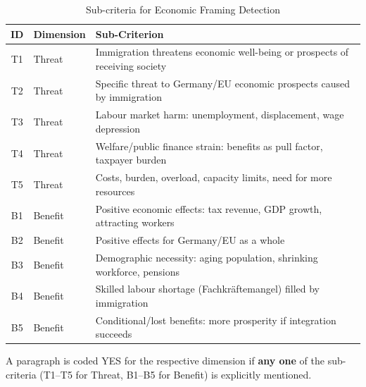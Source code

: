 \begin{table}[H]
\centering
\caption{Sub-criteria for Economic Framing Detection}
\label{tab:subcriteria}
\begin{tabular}{@{}clp{9cm}@{}}
\toprule
\textbf{ID} & \textbf{Dimension} & \textbf{Sub-Criterion} \\
\midrule
T1 & Threat & Immigration threatens economic well-being or prospects of receiving society \\
T2 & Threat & Specific threat to Germany/EU economic prospects caused by immigration \\
T3 & Threat & Labour market harm: unemployment, displacement, wage depression \\
T4 & Threat & Welfare/public finance strain: benefits as pull factor, taxpayer burden \\
T5 & Threat & Costs, burden, overload, capacity limits, need for more resources \\
\midrule
B1 & Benefit & Positive economic effects: tax revenue, GDP growth, attracting workers \\
B2 & Benefit & Positive effects for Germany/EU as a whole \\
B3 & Benefit & Demographic necessity: aging population, shrinking workforce, pensions \\
B4 & Benefit & Skilled labour shortage (Fachkr\"aftemangel) filled by immigration \\
B5 & Benefit & Conditional/lost benefits: more prosperity if integration succeeds \\
\bottomrule
\end{tabular}
\end{table}

A paragraph is coded YES for the respective dimension if \textbf{any one} of the sub-criteria (T1--T5 for Threat, B1--B5 for Benefit) is explicitly mentioned.

\newpage
